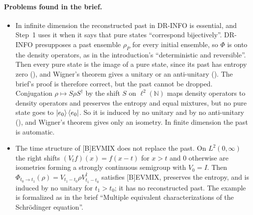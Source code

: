 \documentclass[11pt]{article}
\begin{document}
\paragraph{Problems found in the brief.}
\begin{itemize}
\item In infinite dimension the reconstructed past in DR-INFO is essential, and Step~1 uses it
  when it says that pure states ``correspond bijectively''. DR-INFO presupposes a past ensemble
  $\rho_P$ for every initial ensemble, so $\Phi$ is onto the density operators, as in the
  introduction's ``deterministic and reversible''. Then every pure state is the image of a pure
  state, since its past has entropy zero (), and Wigner's theorem gives
  a unitary or an anti-unitary (). The brief's proof
  is therefore correct, but the past cannot be dropped. Conjugation
  $\rho \mapsto S\rho S^\dagger$ by the shift $S$ on $\ell^2(\mathbb{N})$ maps density operators
  to density operators and preserves the entropy and equal mixtures, but no pure state goes to
  $\ket{e_0}\bra{e_0}$. So it is induced by no unitary and by no anti-unitary
  (), and Wigner's theorem gives only an isometry. In finite
  dimension the past is automatic.
\item The time structure of [B]EVMIX does not replace the past. On $L^2(0,\infty)$ the right
  shifts $(V_tf)(x) = f(x-t)$ for $x > t$ and $0$ otherwise are isometries forming a strongly
  continuous semigroup with $V_0 = I$. Then $\Phi_{t_0 \to t_1}(\rho) =
  V_{t_1-t_0}\rho V_{t_1-t_0}^\dagger$ satisfies [B]EVMIX, preserves the entropy, and is induced
  by no unitary for $t_1 > t_0$; it has no reconstructed past. The example is formalized as
   in the brief ``Multiple equivalent characterizations of
  the Schr\"odinger equation''.


\end{itemize}
\end{document}
